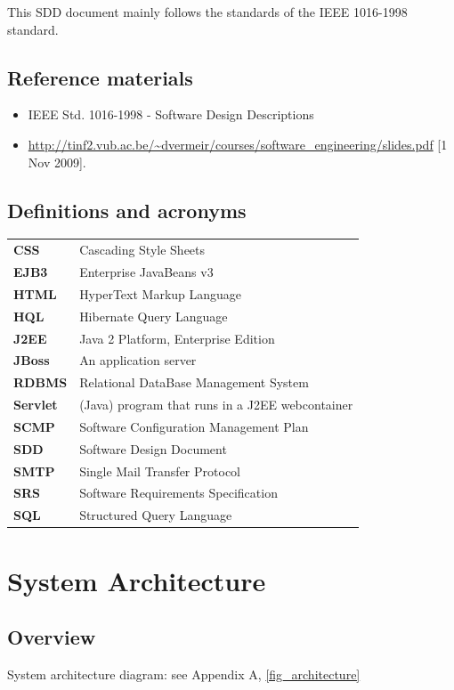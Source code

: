 \documentclass[a4paper, 12pt]{report}
\begin{document}
This SDD document mainly follows the standards of the IEEE 1016-1998 standard.

\section{Reference materials}
\begin{itemize}
\item IEEE Std. 1016-1998 - Software Design Descriptions
\item \url{http://tinf2.vub.ac.be/~dvermeir/courses/software_engineering/slides.pdf} [1 Nov 2009].
\end{itemize}

\section{Definitions and acronyms \label{acronyms}}
\begin{tabular}{ll}
\textbf{CSS}   & Cascading Style Sheets \\
\textbf{EJB3}   & Enterprise JavaBeans v3 \\
\textbf{HTML}   & HyperText Markup Language \\
\textbf{HQL}   & Hibernate Query Language \\
\textbf{J2EE}   & Java 2 Platform, Enterprise Edition \\
\textbf{JBoss}   & An application server \\
\textbf{RDBMS}    & Relational DataBase Management System \\
\textbf{Servlet}   & (Java) program that runs in a J2EE webcontainer  \\
\textbf{SCMP}   & Software Configuration Management Plan \\
\textbf{SDD}    & Software Design Document \\
\textbf{SMTP}   & Single Mail Transfer Protocol \\
\textbf{SRS}    & Software Requirements Specification \\
\textbf{SQL}   & Structured Query Language \\
\end{tabular}

\pagebreak
\chapter{System Architecture}
\section{Overview}
System architecture diagram: see Appendix A, \ref{fig_architecture}
\end{document}
